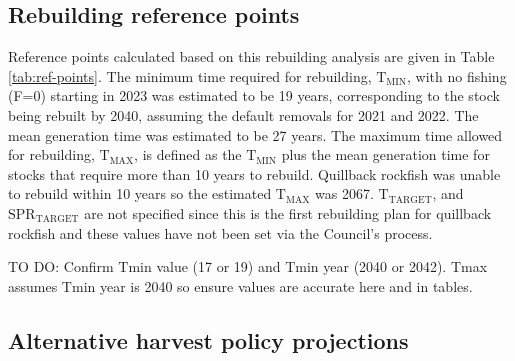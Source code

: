 \documentclass[11pt,
  english,
  a4paper,
]{article}
\begin{document}
\hypertarget{rebuilding-reference-points}{%
\subsection{Rebuilding reference points}\label{rebuilding-reference-points}}

\leavevmode\tagmcend\tagstructend


Reference points calculated based on this rebuilding analysis are given in Table \ref{tab:ref-points}. The minimum time required for rebuilding, {\(\text{T}_\text{MIN}\)\leavevmode\tagmcend\tagstructend}, with no fishing (F=0) starting in 2023 was estimated to be 19 years, corresponding to the stock being rebuilt by 2040, assuming the default removals for 2021 and 2022. The mean generation time was estimated to be 27 years. The maximum time allowed for rebuilding, {\(\text{T}_\text{MAX}\)\leavevmode\tagmcend\tagstructend}, is defined as the {\(\text{T}_\text{MIN}\)\leavevmode\tagmcend\tagstructend} plus the mean generation time for stocks that require more than 10 years to rebuild. Quillback rockfish was unable to rebuild within 10 years so the estimated {\(\text{T}_\text{MAX}\)\leavevmode\tagmcend\tagstructend} was 2067. {\(\text{T}_\text{TARGET}\)\leavevmode\tagmcend\tagstructend}, and {\(\text{SPR}_\text{TARGET}\)\leavevmode\tagmcend\tagstructend} are not specified since this is the first rebuilding plan for quillback rockfish and these values have not been set via the Council's process.

\leavevmode\tagmcend\tagstructend\par


TO DO: Confirm Tmin value (17 or 19) and Tmin year (2040 or 2042). Tmax assumes Tmin year is 2040 so ensure values are accurate here and in tables.

\leavevmode\tagmcend\tagstructend\par


\hypertarget{alternative-harvest-policy-projections}{%
\subsection{Alternative harvest policy projections}\label{alternative-harvest-policy-projections}}
\end{document}
